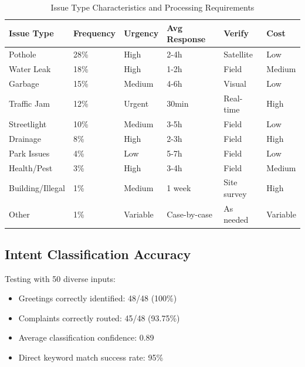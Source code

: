 \documentclass[11pt,a4paper]{article}
\begin{document}
\begin{table}[H]
\centering
\caption{Issue Type Characteristics and Processing Requirements}
\label{tab:issue_types}
\begin{tabular}{|l|l|l|l|l|l|}
\hline
\textbf{Issue Type} & \textbf{Frequency} & \textbf{Urgency} & \textbf{Avg Response} & \textbf{Verify} & \textbf{Cost} \\
\hline
Pothole & 28\% & High & 2-4h & Satellite & Low \\
Water Leak & 18\% & High & 1-2h & Field & Medium \\
Garbage & 15\% & Medium & 4-6h & Visual & Low \\
Traffic Jam & 12\% & Urgent & 30min & Real-time & High \\
Streetlight & 10\% & Medium & 3-5h & Field & Low \\
Drainage & 8\% & High & 2-3h & Field & High \\
Park Issues & 4\% & Low & 5-7h & Field & Low \\
Health/Pest & 3\% & High & 3-4h & Field & Medium \\
Building/Illegal & 1\% & Medium & 1 week & Site survey & High \\
Other & 1\% & Variable & Case-by-case & As needed & Variable \\
\hline
\end{tabular}
\end{table}

\subsection{Intent Classification Accuracy}

Testing with 50 diverse inputs:
\begin{itemize}
    \item Greetings correctly identified: 48/48 (100\%)
    \item Complaints correctly routed: 45/48 (93.75\%)
    \item Average classification confidence: 0.89
    \item Direct keyword match success rate: 95\%
\end{itemize}
\end{document}
